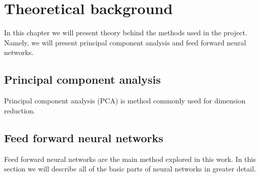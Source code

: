 \chapter{Theoretical background}

In this chapter we will present theory behind the methods used in the project. 
Namely, we will present principal component analysis and feed forward neural networks.

\section{Principal component analysis}
Principal component analysis (PCA) is method commonly used for dimension reduction.

\section{Feed forward neural networks}
Feed forward neural networks are the main method explored in this work.
In this section we will describe all of the basic parts of neural networks in greater detail.